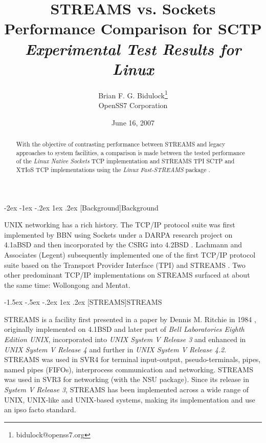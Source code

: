 \documentclass[letterpaper,final,notitlepage,twocolumn,10pt,twoside]{article}
\makeatletter
\renewcommand\section{\@startsection {section}{1}{\z@}%
                                   {-2ex \@plus -1ex \@minus -.2ex}%
                                   {1ex \@plus .2ex}%
                                   {\normalfont\large\bfseries}}
\renewcommand\subsection{\@startsection{subsection}{2}{\z@}%
                                     {-1.5ex \@plus -.5ex \@minus -.2ex}%
                                     {1ex \@plus .2ex}%
                                     {\normalfont\normalsize\bfseries}}
\makeatother
\begin{document}

\title{STREAMS vs. Sockets Performance Comparison for SCTP\\[0.5ex]
	{\large \textsl{Experimental Test Results for Linux}}}
\author{Brian F. G. Bidulock\thanks{bidulock@openss7.org}\\
	OpenSS7 Corporation}
\date{June 16, 2007}
\maketitle

\begin{abstract}
With the objective of contrasting performance between STREAMS and legacy approaches to system
facilities, a comparison is made between the tested performance of the \textsl{Linux Native Sockets} TCP
implementation and STREAMS TPI SCTP and XTIoS TCP
implementations using the \textsl{Linux Fast-STREAMS} package \cite[]{LfS}.
\end{abstract}


\section[Background]{Background}

UNIX networking has a rich history.  The TCP/IP protocol suite was first implemented by BBN using
Sockets under a DARPA research project on 4.1aBSD and then incorporated by the CSRG into 4.2BSD
\cite[]{bsd}.  Lachmann and Associates (Legent) subsequently implemented one of the first TCP/IP
protocol suite based on the Transport Provider Interface (TPI) \cite[]{tli} and STREAMS
\cite[]{magic}.  Two other predominant TCP/IP implementations on STREAMS surfaced at about the same
time: Wollongong and Mentat.

\subsection[STREAMS]{STREAMS}

STREAMS is a facility first presented in a paper by Dennis M. Ritchie in 1984 \cite[]{Ritchie84},
originally implemented on 4.1BSD and later part of \textsl{Bell Laboratories Eighth Edition UNIX},
incorporated into \textsl{UNIX System V Release 3} and enhanced in \textsl{UNIX System V Release 4}
and further in \textsl{UNIX System V Release 4.2}.  STREAMS was used in SVR4 for terminal
input-output, pseudo-terminals, pipes, named pipes (FIFOs), interprocess communication and
networking.  STREAMS was used in SVR3 for networking (with the NSU package).  Since its release in
\textsl{System V Release 3}, STREAMS has been implemented across a wide range of UNIX, UNIX-like and
UNIX-based systems, making its implementation and use an ipso facto standard.
\end{document}

